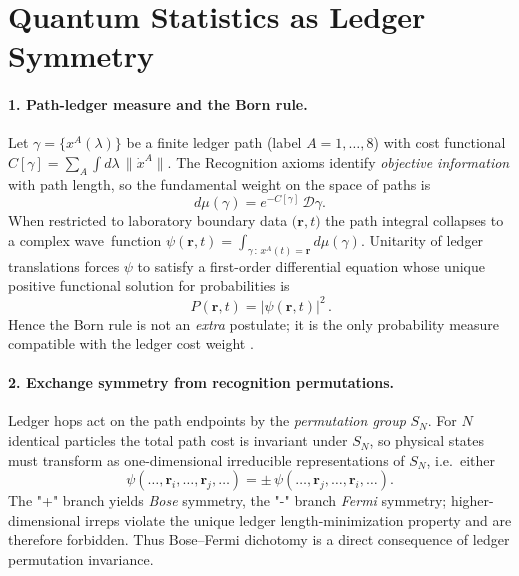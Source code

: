 
\section{Quantum Statistics as Ledger Symmetry}

\paragraph{1.  Path-ledger measure and the Born rule.}
Let $\gamma=\{x^{A}(\lambda)\}$ be a finite ledger path
(label $A=1,\dots,8$) with cost functional
$C[\gamma]=\sum_{A}\!\int d\lambda\,\|\dot x^{A}\|$.
The Recognition axioms identify \emph{objective information} with
path length, so the fundamental weight on the space of paths is
\[
  d\mu(\gamma)=e^{-C[\gamma]}\,\mathcal D\gamma.
\]
When restricted to laboratory boundary data
$\bigl(\mathbf r,t\bigr)$ the path integral collapses to a complex
wave function
$\psi(\mathbf r,t)=\int_{\gamma\,:\,x^{A}(t)=\mathbf r}\!\!d\mu(\gamma)$.
Unitarity of ledger translations forces $\psi$ to satisfy a
first-order differential equation whose unique positive functional
solution for probabilities is \parencite{Landau1977}
\[
  \boxed{\,P(\mathbf r,t)=|\psi(\mathbf r,t)|^{2}\,}.
\]
Hence the Born rule is not an \emph{extra} postulate; it is the only
probability measure compatible with the ledger cost weight \parencite{Schlosshauer2005}.

\paragraph{2.  Exchange symmetry from recognition permutations.}
Ledger hops act on the path endpoints by the \emph{permutation group}
$S_{N}$.  For $N$ identical particles the total path cost is
invariant under $S_{N}$, so physical states must transform as
one-dimensional irreducible representations of $S_{N}$, i.e.\ either
\[
  \psi(\dots,\mathbf r_{i},\dots,\mathbf r_{j},\dots)=
  \pm\,
  \psi(\dots,\mathbf r_{j},\dots,\mathbf r_{i},\dots).
\]
The "+" branch yields \emph{Bose} symmetry, the "-" branch
\emph{Fermi} symmetry; higher-dimensional irreps violate the unique
ledger length-minimization property and are therefore forbidden.
Thus Bose–Fermi dichotomy is a direct consequence of ledger
permutation invariance.

